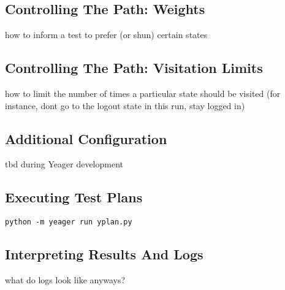 \subsection{Controlling The Path: Weights}
how to inform a test to prefer (or shun) certain states

\subsection{Controlling The Path: Visitation Limits}
how to limit the number of times a particular state should be visited (for instance, dont go to the logout state in this run, stay logged in)

\subsection{Additional Configuration}
tbd during Yeager development

\subsection{Executing Test Plans}
\texttt{python -m yeager run yplan.py}

\subsection{Interpreting Results And Logs}
what do logs look like anyways?
